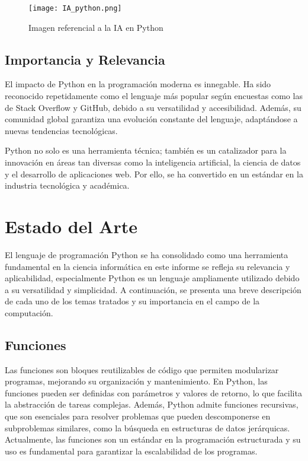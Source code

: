 \documentclass[conference]{IEEEtran}
\begin{document}
            \begin{figure}[h]
            \centering
            \texttt{[image: IA\_python.png]}
            \caption{Imagen referencial a la IA en Python} 
            \end{figure}
            

\subsection{Importancia y Relevancia}

El impacto de Python en la programación moderna es innegable. Ha sido reconocido repetidamente como el lenguaje más popular según encuestas como las de Stack Overflow y GitHub, debido a su versatilidad y accesibilidad. Además, su comunidad global garantiza una evolución constante del lenguaje, adaptándose a nuevas tendencias tecnológicas.  

Python no solo es una herramienta técnica; también es un catalizador para la innovación en áreas tan diversas como la inteligencia artificial, la ciencia de datos y el desarrollo de aplicaciones web. Por ello, se ha convertido en un estándar en la industria tecnológica y académica.  


\section{Estado del Arte}

El lenguaje de programación Python se ha consolidado como una herramienta fundamental en la ciencia informática en este informe se refleja su relevancia y aplicabilidad, especialmente Python es un lenguaje ampliamente utilizado debido a su versatilidad y simplicidad. A continuación, se presenta una breve descripción de cada uno de los temas tratados y su importancia en el campo de la computación.


\subsection{Funciones}
Las funciones son bloques reutilizables de código que permiten modularizar programas, mejorando su organización y mantenimiento. En Python, las funciones pueden ser definidas con parámetros y valores de retorno, lo que facilita la abstracción de tareas complejas. Además, Python admite funciones recursivas, que son esenciales para resolver problemas que pueden descomponerse en subproblemas similares, como la búsqueda en estructuras de datos jerárquicas. Actualmente, las funciones son un estándar en la programación estructurada y su uso es fundamental para garantizar la escalabilidad de los programas.
\end{document}
